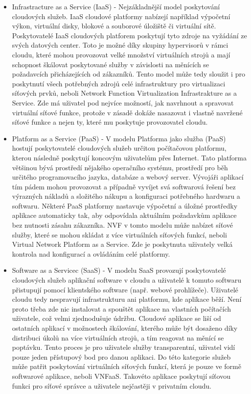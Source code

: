 \begin{itemize}
\item Infrastracture as a Service (IaaS) - Nejzákladnější  model  poskytování  cloudových  služeb. IaaS cloudové platformy nabízejí například výpočetní výkon, virtuální disky, blokové a souborové úložiště či virtuální sítě.  Poskytovatelé  IaaS  cloudových  platforem  poskytují tyto zdroje na vyžádání ze svých datových center. Toto je možné díky skupiny hypervisorů v rámci cloudu, které mohou provozovat velké množství virtuálních strojů  a  mají  schopnost  škálovat  poskytované  služby v  závislosti  na  měnících  se požadavcích přicházejících od zákazníků. Tento model může tedy sloužit i pro poskytnutí všech potřebných zdrojů celé infrastruktury pro virtualizaci síťových prvků, neboli Network Function Virtualization Infrastrakture as a Service. Zde má uživatel pod nejvíce možností, jak navrhnout a spravovat virtuální síťové funkce, protože v zásadě dokáže nasazovat i vlastně navržené síťové funkce a nejen ty, které mu poskytuje provozovatel cloudu.
\item Platform as a Service (PaaS) - V  modelu  Platforma  jako  služba  (PaaS)  hostují  poskytovatelé cloudových  služeb určitou počítačovou  platformu, kterou následně poskytují koncovým uživatelům přes Internet. Tato platforma většinou bývá prostředí nějakého operačního systému, prostředí  pro  běh  určitého programovacího  jazyka,  databáze  a  webový  server.  Vývojáři  aplikací tím pádem  mohou provozovat a případně vyvíjet svá softwarová řešení bez výrazných nákladů a složitého nákupu a konfiguraci potřebného hardwaru a softwaru. Některé PaaS platformy nastavuje výpočetní  a  úložné  prostředky  aplikace  automaticky  tak,  aby  odpovídala  aktuálním požadavkům aplikace bez nutnosti zásahu zákazníka. NVF v tomto modelu může nabízet síťové služby, které se mohou skládat z více virtuálních síťových funkcí, neboli Virtual Network Platform as a Service. Zde je poskytnuta uživately velká kontrola nad konfigurací a ovládáním celé platformy.
\item Software as a Servicec (SaaS) - V modelu SaaS provozují poskytovatelé cloudových služeb aplikační software v cloudu a uživatelé  k  tomuto  softwaru  přistupují  pomocí  klientského  software  (např.  webové prohlížeče). Uživatelé  cloudu tedy  nespravují infrastrukturu  ani platformu, kde aplikace běží.  Není  proto  třeba zde nic instalovat  a  spouštět  aplikace  na  vlastních  počítačích uživatele, což velmi zjednodušuje údržbu. Cloudové aplikace se liší od ostatních aplikací v možnostech  škálování, kterého  může  být  dosaženo  díky  distribuci  úkolů  na  více virtuálních strojů, a tím reagovat na měnící se poptávku. Tento proces je pro uživatele služby transparentní, uživatel vidí pouze jeden přístupový bod pro danou aplikaci. Do této kategorie služeb může patřit poskytování virtuálních síťových funkcí, která je pouze ve formě softwarové aplikace, neboli VNFaaS. Takovéto aplikace poskytují síťovou funkci pro síťové správce a uživatele nejčastěji v privatním cloudu. 
\end{itemize}

